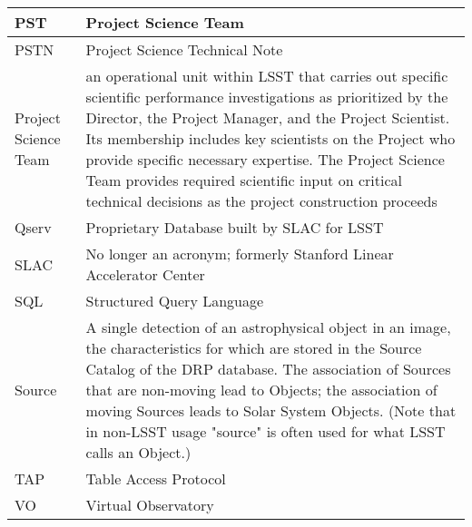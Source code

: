 \begin{longtable}{|l|p{}|}
PST & Project Science Team \\\hline
PSTN & Project Science Technical Note \\\hline
Project Science Team & an operational unit within LSST that carries out specific scientific performance investigations as prioritized by the Director, the Project Manager, and the Project Scientist. Its membership includes key scientists on the Project who provide specific necessary expertise. The Project Science Team provides required scientific input on critical technical decisions as the project construction proceeds \\\hline
Qserv & Proprietary Database built by SLAC for LSST \\\hline
SLAC & No longer an acronym; formerly Stanford Linear Accelerator Center \\\hline
SQL & Structured Query Language \\\hline
Source & A single detection of an astrophysical object in an image, the characteristics for which are stored in the Source Catalog of the DRP database. The association of Sources that are non-moving lead to Objects; the association of moving Sources leads to Solar System Objects. (Note that in non-LSST usage "source" is often used for what LSST calls an Object.) \\\hline
TAP & Table Access Protocol \\\hline
VO & Virtual Observatory \\\hline
\end{longtable}
